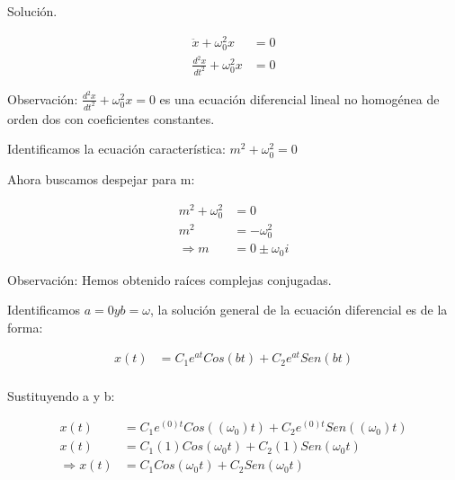 

 Solución.

 \begin{align*}
    \ddot{x} + \omega_{0}^{2} x &= 0 \\
    \frac{d^{2} x}{dt^{2}} + \omega_{0}^{2} x &= 0 
\end{align*}

Observación: $\frac{d^{2} x}{dt^{2}} + \omega_{0}^{2} x = 0 $ es una ecuación diferencial lineal
no homogénea de orden dos con coeficientes constantes.

\vspace*{0.3 cm}

Identificamos la ecuación característica: $ m^{2} + \omega_{0}^{2} = 0 $

Ahora buscamos despejar para m:

\begin{align*}
    m^{2} + \omega_{0}^{2} &= 0 \\
    m^{2}  &= - \omega_{0}^{2} \\
    \Rightarrow m &= 0 \pm \omega_{0} i
\end{align*}

Observación: Hemos obtenido raíces complejas conjugadas.

\vspace*{0.3 cm}

Identificamos $ a=0 y b=\omega $, la solución general de la ecuación diferencial
es de la forma:

\begin{align*}
    x(t) &= C_{1}e^{at}Cos(bt) + C_{2}e^{at}Sen(bt) \\
\end{align*}

Sustituyendo a y b:

\begin{align*}
    x(t) &= C_{1}e^{(0)t}Cos((\omega_{0})t) + C_{2}e^{(0)t}Sen((\omega_{0})t) \\
    x(t) &= C_{1}(1)Cos(\omega_{0}t) + C_{2}(1)Sen(\omega_{0}t) \\
    \Rightarrow x(t) &= C_{1}Cos(\omega_{0}t) + C_{2}Sen(\omega_{0}t)
\end{align*}

